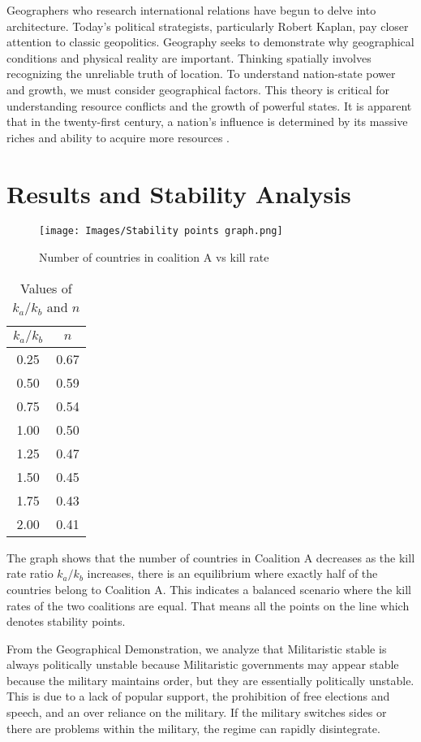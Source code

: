 \documentclass[oneside,12pt]{report}
\begin{document}
Geographers who research international relations have begun to delve into architecture. Today's political strategists, particularly Robert Kaplan, pay closer attention to classic geopolitics. Geography seeks to demonstrate why geographical conditions and physical reality are important. Thinking spatially involves recognizing the unreliable truth of location. To understand nation-state power and growth, we must consider geographical factors. This theory is critical for understanding resource conflicts and the growth of powerful states. It is apparent that in the twenty-first century, a nation's influence is determined by its massive riches and ability to acquire more resources \cite{r5}.

\newpage
\chapter{Results and Stability Analysis}

\begin{figure} [h]
    \centering
    \texttt{[image: Images/Stability points graph.png]}
    \caption{Number of countries in coalition A vs kill rate}
    \label{fig:2.1.2}
\end{figure}

\newpage
\begin{table}[h]
\centering
\begin{tabular}{|c|c|}
\hline
$k_a/k_b$ & $n$ \\
\hline
0.25 & 0.67 \\
0.50 & 0.59 \\
0.75 & 0.54 \\
1.00 & 0.50 \\
1.25 & 0.47 \\
1.50 & 0.45 \\
1.75 & 0.43 \\
2.00 & 0.41 \\
\hline
\end{tabular}
\caption{Values of $k_a/k_b$ and $n$}
\label{tab:k_ak_b_n}
\end{table}


The graph shows that the number of countries in Coalition A decreases as the kill rate ratio \(k_a/k_b\) increases, there is an equilibrium where exactly half of the countries belong to Coalition A. This indicates a balanced scenario where the kill rates of the two coalitions are equal. That means all the points on the line which denotes stability points.

From the Geographical Demonstration, we analyze that Militaristic stable is always politically unstable because Militaristic governments may appear stable because the military maintains order, but they are essentially politically unstable. This is due to a lack of popular support, the prohibition of free elections and speech, and an over reliance on the military. If the military switches sides or there are problems within the military, the regime can rapidly disintegrate.
\end{document}
